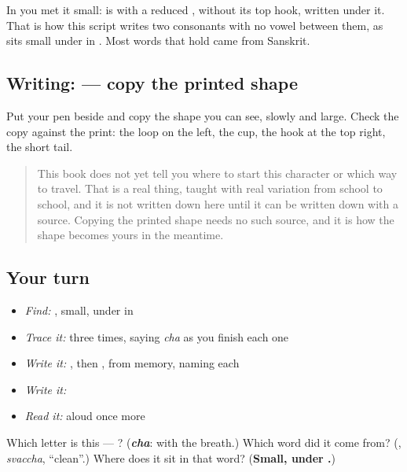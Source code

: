 In \textbf{} you met it small: \textbf{} is \textbf{} with a reduced \textbf{}, without its top hook, written under it. That is how this script writes two consonants with no vowel between them, as \textbf{} sits small under \textbf{} in \textbf{}. Most words that hold \textbf{} came from Sanskrit.

\subsection*{Writing:  — copy the printed shape}
Put your pen beside \textbf{} and copy the shape you can see, slowly and large. Check the copy against the print: the loop on the left, the cup, the hook at the top right, the short tail.

\begin{quote}
This book does not yet tell you where to start this character or which way to travel. That is a real thing, taught with real variation from school to school, and it is not written down here until it can be written down with a source. Copying the printed shape needs no such source, and it is how the shape becomes yours in the meantime.
\end{quote}

\subsection*{Your turn}
\begin{itemize}
\raggedright
  \item \emph{Find:} , small, under  in \textbf{}
  \item \emph{Trace it:}  three times, saying \emph{cha} as you finish each one
  \item \emph{Write it:} , then , from memory, naming each
  \item \emph{Write it:} \textbf{}
  \item \emph{Read it:} \textbf{} aloud once more
\end{itemize}

\begin{tcolorbox}[breakable,colback=teal!4,colframe=teal!35!black,title={Before you move on}]
Which letter is this — ? (\emph{\textbf{cha}}: \textbf{} with the breath.) Which word did it come from? (\textbf{}, \emph{svaccha}, \textquotedblleft{}clean\textquotedblright{}.) Where does it sit in that word? (\textbf{Small, under .})
\end{tcolorbox}

